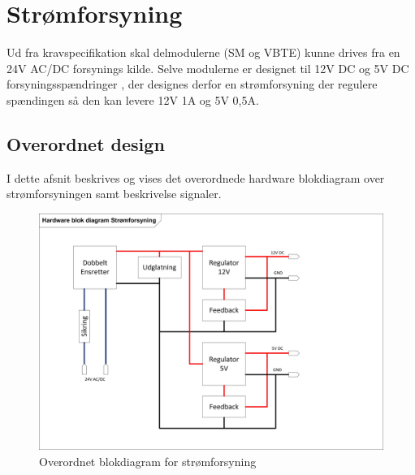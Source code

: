 \chapter{Strømforsyning}
Ud fra kravspecifikation skal delmodulerne (SM og VBTE) kunne drives fra en 24V AC/DC forsynings kilde. Selve modulerne er designet til 12V DC og 5V DC forsyningsspændringer , der designes derfor en strømforsyning der regulere spændingen så den kan levere 12V 1A og 5V 0,5A.  

\section{Overordnet design}
I dette afsnit beskrives og vises det overordnede hardware blokdiagram over strømforsyningen samt beskrivelse signaler.

\begin{figure}[H]
\centering
\includegraphics[width=1\textwidth]{billeder/PowerSupplyBlok}
\caption{Overordnet blokdiagram for strømforsyning}
\label{fig:PowerSubbly Blok}
\end{figure}